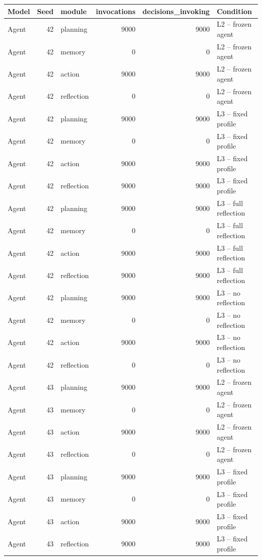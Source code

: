 \begin{table}[htbp!]
\centering
\small
\setlength{\tabcolsep}{3pt}
\renewcommand{\arraystretch}{1.1}
\begin{tabular}{lrlrrl}
\hline
Model & Seed & module & invocations & decisions\_invoking & Condition \\
\hline
Agent & 42 & planning & 9000 & 9000 & L2 -- frozen agent \\
Agent & 42 & memory & 0 & 0 & L2 -- frozen agent \\
Agent & 42 & action & 9000 & 9000 & L2 -- frozen agent \\
Agent & 42 & reflection & 0 & 0 & L2 -- frozen agent \\
Agent & 42 & planning & 9000 & 9000 & L3 -- fixed profile \\
Agent & 42 & memory & 0 & 0 & L3 -- fixed profile \\
Agent & 42 & action & 9000 & 9000 & L3 -- fixed profile \\
Agent & 42 & reflection & 9000 & 9000 & L3 -- fixed profile \\
Agent & 42 & planning & 9000 & 9000 & L3 -- full reflection \\
Agent & 42 & memory & 0 & 0 & L3 -- full reflection \\
Agent & 42 & action & 9000 & 9000 & L3 -- full reflection \\
Agent & 42 & reflection & 9000 & 9000 & L3 -- full reflection \\
Agent & 42 & planning & 9000 & 9000 & L3 -- no reflection \\
Agent & 42 & memory & 0 & 0 & L3 -- no reflection \\
Agent & 42 & action & 9000 & 9000 & L3 -- no reflection \\
Agent & 42 & reflection & 0 & 0 & L3 -- no reflection \\
Agent & 43 & planning & 9000 & 9000 & L2 -- frozen agent \\
Agent & 43 & memory & 0 & 0 & L2 -- frozen agent \\
Agent & 43 & action & 9000 & 9000 & L2 -- frozen agent \\
Agent & 43 & reflection & 0 & 0 & L2 -- frozen agent \\
Agent & 43 & planning & 9000 & 9000 & L3 -- fixed profile \\
Agent & 43 & memory & 0 & 0 & L3 -- fixed profile \\
Agent & 43 & action & 9000 & 9000 & L3 -- fixed profile \\
Agent & 43 & reflection & 9000 & 9000 & L3 -- fixed profile \\

\end{tabular}
\end{table}
